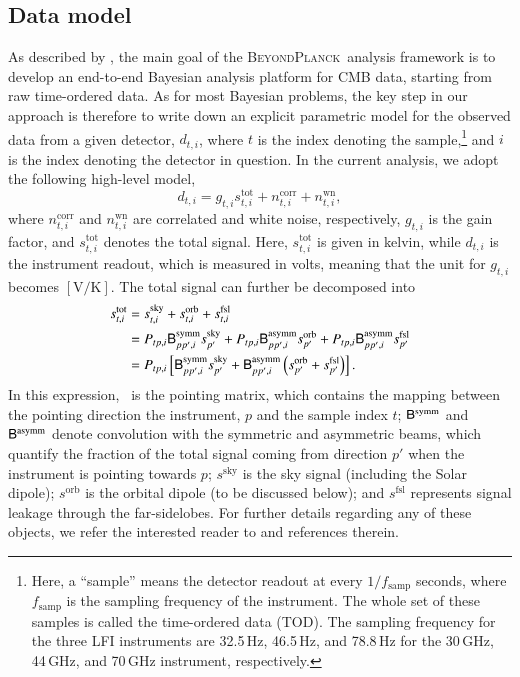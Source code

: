 \documentclass[twocolumn]{aa}
\newcommand{\B}[0]{\tens{B}}
\renewcommand{\P}[0]{\tens{P}}
\newcommand{\BP}{\textsc{BeyondPlanck}}
\newcommand{\ti}[0]{_{t, i}}
\newcommand{\tot}[0]{^{\mathrm{tot}}}
\newcommand{\corr}[0]{^{\mathrm{corr}}}
\newcommand{\wn}[0]{^{\mathrm{wn}}}
\newcommand{\sky}[0]{^{\mathrm{sky}}}
\newcommand{\orb}[0]{^{\mathrm{orb}}}
\begin{document}
\subsection{Data model}
\label{sec:gain_modelling}
As described by \citet{bp01}, the main goal of the \BP\ analysis framework is to develop an end-to-end Bayesian analysis platform for CMB data, starting from raw time-ordered data. As for most Bayesian problems, the key step in our approach is therefore to write down an explicit parametric model for the observed data from a given detector, $d\ti$, where $t$ is the index denoting the sample,\footnote{Here, a ``sample'' means the detector readout at every $1/f_\mathrm{samp}$ seconds, where $f_\mathrm{samp}$ is the sampling frequency of the instrument. The whole set of these samples is called the time-ordered data (TOD). The sampling frequency for the three LFI instruments are 32.5\,Hz, 46.5\,Hz, and 78.8\,Hz for the 30\,GHz, 44\,GHz, and 70\,GHz instrument, respectively.} and $i$ is the index denoting the detector in question. In the current analysis, we adopt the following high-level model,
\begin{equation}
    d\ti = g\ti s\ti\tot + n\ti\corr + n\ti\wn,
    \label{eq:gen_data_model}
\end{equation}
where $n\ti\corr$ and $n\ti\wn$ are correlated and white noise, respectively, $g\ti$ is the gain factor, and $s\ti\tot$ denotes the total signal. Here, $s\ti\tot$ is given in kelvin, while $d\ti$ is the instrument readout, which is measured in volts, meaning that the unit for $g\ti$ becomes $[\mathrm{V/K}]$. The total signal can further be decomposed into
\begin{align}
    s\ti\tot &= s\ti\sky + s\ti\orb + s\ti^{\mathrm{fsl}} \nonumber \\ 
    &= P_{tp, i}\B^{\mathrm{symm}}_{pp', i} s_{p'}\sky + P_{tp, i}\B^{\mathrm{asymm}}_{pp', i}s_{p'}\orb + P_{tp, i}\B^{\mathrm{asymm}}_{pp', i}s_{p'}^{\mathrm{fsl}} \nonumber \\
    & = P_{tp, i}\left[\B^{\mathrm{symm}}_{pp', i} s_{p'}^{\mathrm{sky}} + \B_{pp', i}^{\mathrm{asymm}}\left(s_{p'}\orb + s_{p'}^{\mathrm{fsl}}\right)\right].
\end{align}
In this expression, \P\ is the pointing matrix, which contains the mapping between the pointing direction the instrument, $p$ and the sample index $t$; $\B^{\mathrm{symm}}$ and $\B^{\mathrm{asymm}}$ denote convolution with the symmetric and asymmetric beams, which quantify the fraction of the total signal coming from direction $p'$ when the instrument is pointing towards $p$; $s^{\mathrm{sky}}$ is the sky signal (including the Solar dipole); $s^{\mathrm{orb}}$ is the orbital dipole (to be discussed below); and $s^{\mathrm{fsl}}$ represents signal leakage through the far-sidelobes. For further details regarding any of these objects, we refer the interested reader to \citet{bp01} and references therein.
\end{document}
